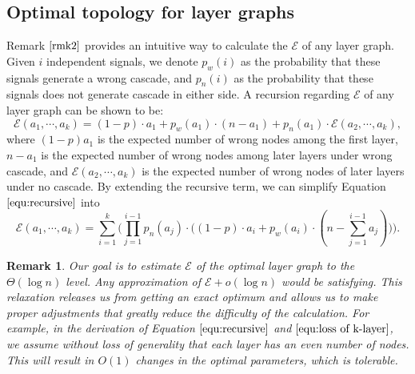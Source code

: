 \documentclass[a4paper,UKenglish]{lipics}
\newtheorem{rmk}{Remark}
\theoremstyle{definition}
\begin{document}
\subsection {Optimal topology for layer graphs}

Remark $\ref{rmk2}$ provides an intuitive way to calculate the $\mathcal{E}$ of any layer graph.
Given $i$ independent signals, we denote $p_w(i)$ as the probability that these signals generate a wrong cascade,
	and $p_n(i)$ as the probability that these signals does not generate cascade in either side.
A recursion regarding $\mathcal{E}$ of any layer graph can be shown to be:
\begin{equation}
\label{equ:recursive}
	\mathcal{E}(a_1, \dotsb, a_k)
=
	(1-p)\cdot a_1 + p_w(a_1)\cdot (n - a_1) + p_n(a_1)\cdot \mathcal{E}(a_2, \dotsb, a_k),
\end{equation}
where $(1-p)a_1$ is the expected number of wrong nodes among the first layer, 
	$n-a_1$ is the expected number of wrong nodes among later layers under wrong cascade,
	and $\mathcal{E}(a_2, \dotsb, a_k)$ is the expected number of wrong nodes of later layers under no cascade.
By extending the recursive term, we can simplify Equation $\eqref{equ:recursive}$ into
\begin{equation}
\label{equ:loss of k-layer}
	\mathcal{E}(a_1, \dotsb, a_k)
=
	\sum_{i=1}^{k} \Big(
		\prod_{j=1}^{i-1}p_n(a_j) \cdot \Big(  (1-p)\cdot a_i + p_w(a_i)\cdot (n - \sum_{j=1}^{i-1}a_j) \Big)
	\Big).
\end{equation}
\begin{rmk}
\label{rmk:estimation}
Our goal is to estimate $\mathcal{E}$ of the optimal layer graph
	to the $\Theta(\log n)$ level.
Any approximation of $\mathcal{E} + o(\log n)$ would be satisfying.
This relaxation releases us from getting an exact optimum and allows us to make proper adjustments that greatly reduce the difficulty of the calculation.
For example, in the derivation of Equation $\eqref{equ:recursive}$ and $\eqref{equ:loss of k-layer}$, we assume without loss of generality that each layer has an even number of nodes.
This will result in $O(1)$ changes in the optimal parameters, which is tolerable.
\end{rmk}
\end{document}
